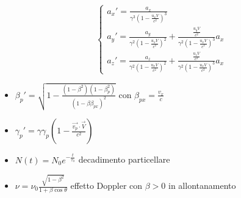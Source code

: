 \documentclass[a4paper]{article}
\begin{document}
\begin{itemize}
                $$\begin{cases}
                    a_x'=\frac{a_x}{\gamma^3\left(1-\frac{u_xV}{c^2}\right)^3}\\
                    a_y'=\frac{a_y}{\gamma^2\left(1-\frac{u_xV}{c^2}\right)^2}+\frac{\frac{u_yV}{c^2}}{\gamma^2\left(1-\frac{u_xV}{c^2}\right)^3}a_x\\
                    a_z'=\frac{a_z}{\gamma^2\left(1-\frac{u_xV}{c^2}\right)^2}+\frac{\frac{u_zV}{c^2}}{\gamma^2\left(1-\frac{u_xV}{c^2}\right)^3}a_x
                \end{cases}$$
            \item $\beta_p'=\sqrt{1-\frac{(1-\beta^2)(1-\beta_p^2)}{(1-\beta\beta_{px})^2}}$ con $\beta_{px}=\frac{v_x}{c}$
            \item $\gamma_p'=\gamma\gamma_p\left(1-\frac{\vec{v_p}\cdot\vec{V}}{c^2}\right)$
            \item $N(t)=N_0e^{-\frac{t}{\tau_0}}$ decadimento particellare
            \item $\nu=\nu_0\frac{\sqrt{1-\beta^2}}{1+\beta\cos{\theta}}$ effetto Doppler con $\beta>0$ in allontanamento
        \end{itemize}
\end{document}
